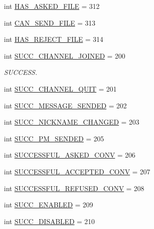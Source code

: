 \begin{DoxyCompactItemize}
int \hyperlink{namespaceserveur_1_1_server_a837bafb63c6e00fb5381b9bea4e63079}{H\+A\+S\+\_\+\+A\+S\+K\+E\+D\+\_\+\+F\+I\+L\+E} = 312
\item 
int \hyperlink{namespaceserveur_1_1_server_aa12a15d74898daa2caab6d6814d75496}{C\+A\+N\+\_\+\+S\+E\+N\+D\+\_\+\+F\+I\+L\+E} = 313
\item 
int \hyperlink{namespaceserveur_1_1_server_a22452d53acf82b8fa8a06e845bdad0ce}{H\+A\+S\+\_\+\+R\+E\+J\+E\+C\+T\+\_\+\+F\+I\+L\+E} = 314
\item 
int \hyperlink{namespaceserveur_1_1_server_ad304925210a67430160b5676248d80d0}{S\+U\+C\+C\+\_\+\+C\+H\+A\+N\+N\+E\+L\+\_\+\+J\+O\+I\+N\+E\+D} = 200
\begin{DoxyCompactList}\small\item\em S\+U\+C\+C\+E\+S\+S. \end{DoxyCompactList}\item 
int \hyperlink{namespaceserveur_1_1_server_ae84e83aefad2ba9384f3a4212fd4285e}{S\+U\+C\+C\+\_\+\+C\+H\+A\+N\+N\+E\+L\+\_\+\+Q\+U\+I\+T} = 201
\item 
int \hyperlink{namespaceserveur_1_1_server_a598115c26902f7ec21c6a8e85661e31e}{S\+U\+C\+C\+\_\+\+M\+E\+S\+S\+A\+G\+E\+\_\+\+S\+E\+N\+D\+E\+D} = 202
\item 
int \hyperlink{namespaceserveur_1_1_server_abc774b5cecac227491c81d7701444ceb}{S\+U\+C\+C\+\_\+\+N\+I\+C\+K\+N\+A\+M\+E\+\_\+\+C\+H\+A\+N\+G\+E\+D} = 203
\item 
int \hyperlink{namespaceserveur_1_1_server_a0539b6dde60545a7317bf2e7f93ab480}{S\+U\+C\+C\+\_\+\+P\+M\+\_\+\+S\+E\+N\+D\+E\+D} = 205
\item 
int \hyperlink{namespaceserveur_1_1_server_aff7a1e808175d6f1a8e3b755000da949}{S\+U\+C\+C\+E\+S\+S\+F\+U\+L\+\_\+\+A\+S\+K\+E\+D\+\_\+\+C\+O\+N\+V} = 206
\item 
int \hyperlink{namespaceserveur_1_1_server_aaf720e9592d40b4fcf6029832ca535da}{S\+U\+C\+C\+E\+S\+S\+F\+U\+L\+\_\+\+A\+C\+C\+E\+P\+T\+E\+D\+\_\+\+C\+O\+N\+V} = 207
\item 
int \hyperlink{namespaceserveur_1_1_server_a9f83ae7ff8cb2651e529da4329f9e970}{S\+U\+C\+C\+E\+S\+S\+F\+U\+L\+\_\+\+R\+E\+F\+U\+S\+E\+D\+\_\+\+C\+O\+N\+V} = 208
\item 
int \hyperlink{namespaceserveur_1_1_server_a19003994913e70d651187ef62efe973c}{S\+U\+C\+C\+\_\+\+E\+N\+A\+B\+L\+E\+D} = 209
\item 
int \hyperlink{namespaceserveur_1_1_server_ab8e45b028661530017c97c32eb7d2dee}{S\+U\+C\+C\+\_\+\+D\+I\+S\+A\+B\+L\+E\+D} = 210

\end{DoxyCompactItemize}
